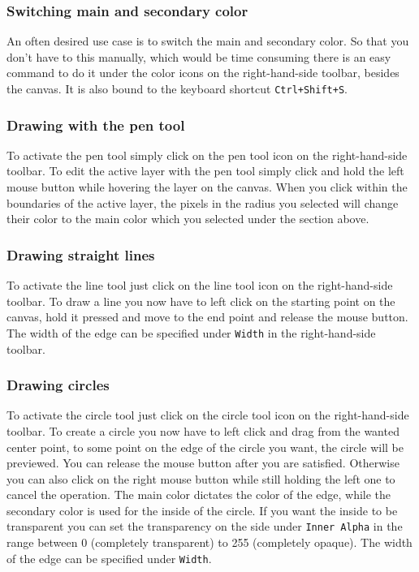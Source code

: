 \documentclass[a4paper, 12pt]{article}
\begin{document}
\subsubsection{Switching main and secondary color}
An often desired use case is to switch the main and secondary color. So that you don't have to this manually, which would be time consuming there is an easy command to do it under the color icons on the right-hand-side toolbar, besides the canvas.
It is also bound to the keyboard shortcut \texttt{Ctrl+Shift+S}.

\subsubsection{Drawing with the pen tool}
To activate the pen tool simply click on the pen tool icon on the right-hand-side  toolbar.
To edit the active layer with the pen tool simply click and hold the left mouse button while hovering the layer on the canvas. When you click within the boundaries of the active layer, the pixels in the radius you selected will change their color to the main color which you selected under the section above.

\subsubsection{Drawing straight lines}
To activate the line tool just click on the line tool icon on the right-hand-side toolbar.
To draw a line you now have to left click on the starting point on the canvas, hold it pressed and move to the end point and release the mouse button. The width of the edge can be specified under \texttt{Width} in the right-hand-side toolbar.

\subsubsection{Drawing circles}
To activate the circle tool just click on the circle tool icon on the right-hand-side toolbar.
To create a circle you now have to left click and drag from the wanted center point, to some point on the edge of the circle you want, the circle will be previewed. You can release the mouse button after you are satisfied. Otherwise you can also click on the right mouse button while still holding the left one to cancel the operation.
The main color dictates the color of the edge, while the secondary color is used for the inside of the circle. If you want the inside to be transparent you can set the transparency on the side under \texttt{Inner Alpha} in the range between 0 (completely transparent) to 255 (completely opaque). The width of the edge can be specified under \texttt{Width}.
\end{document}
